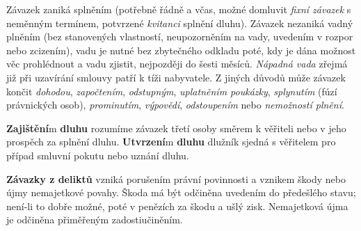 Závazek zaniká splněním (potřebně řádně a včas, možné domluvit \textit{fixní závazek} s neměnným termínem, potvrzené \textit{kvitanci} splnění dluhu). Závazek nezaniká vadný plněním (bez stanovených vlastností, neupozorněním na vady, uvedením v rozpor nebo zcizením), vadu je nutné bez zbytečného odkladu poté, kdy je dána možnost věc prohlédnout a vadu zjistit, nejpozději do šesti měsíců. \textit{Nápadná vada} zřejmá již při uzavírání smlouvy patří k tíži nabyvatele. Z jiných důvodů může závazek končit \textit{dohodou}, \textit{započtením}, \textit{odstupným}, \textit{uplatněním poukázky}, \textit{splynutím} (fúzí právnických osob), \textit{prominutím}, \textit{výpovědí}, \textit{odstoupením} nebo \textit{nemožností plnění}.

\textbf{Zajištění}m \textbf{dluhu} rozumíme závazek třetí osoby směrem k věřiteli nebo v jeho prospěch za splnění dluhu. \textbf{Utvrzení}m \textbf{dluhu} dlužník sjedná s věřitelem pro případ smluvní pokutu nebo uznání dluhu.

\textbf{Závazky z deliktů} vzniká porušením právní povinnosti a vznikem škody nebo újmy nemajetkové povahy. Škoda má být odčiněna uvedením do předešlého stavu; není-li to dobře možné, poté v penězích za škodu a ušlý zisk. Nemajetková újma je odčiněna přiměřeným zadostiučiněním.
